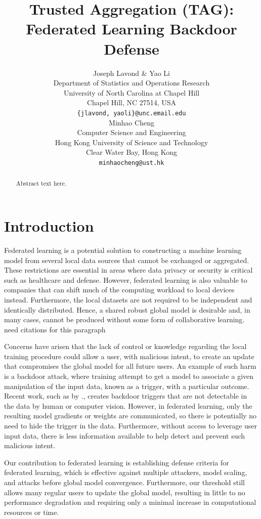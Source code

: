 \documentclass{article} %
\title{
    Trusted Aggregation (TAG): Federated Learning Backdoor Defense
}
\author{%
    Joseph Lavond \& Yao Li  \\
    Department of Statistics and Operations Research \\
    University of North Carolina at Chapel Hill \\
    Chapel Hill, NC 27514, USA \\
    \texttt{\{jlavond, yaoli\}@unc.email.edu} \\
    \And
    Minhao Cheng \\
    Computer Science and Engineering \\
    Hong Kong University of Science and Technology \\
    Clear Water Bay, Hong Kong \\
    \texttt{minhaocheng@ust.hk}
}
\newcommand{\yli}[1]{{\color{cyan}#1}}
\begin{document}
\maketitle

\begin{abstract}
Abstract text here.
\end{abstract}



\section{Introduction}

Federated learning is a potential solution to constructing a machine learning model from several local data sources that cannot be exchanged or aggregated. These restrictions are essential in areas where data privacy or security is critical such as healthcare and defense. However, federated learning is also valuable to companies that can shift much of the computing workload to local devices instead. Furthermore, the local datasets are not required to be independent and identically distributed. Hence, a shared robust global model is desirable and, in many cases, cannot be produced without some form of collaborative learning. \yli{need citations for this paragraph}


Concerns have arisen that the lack of control or knowledge regarding the local training procedure could allow a user, with malicious intent, to create an update that compromises the global model for all future users. An example of such harm is a backdoor attack, where training attempt to get a model to associate a given manipulation of the input data, known as a trigger, with a particular outcome. Recent work, such as by \cite{stamp-invisible}., creates backdoor triggers that are not detectable in the data by human or computer vision. However, in federated learning, only the resulting model gradients or weights are communicated, so there is potentially no need to hide the trigger in the data. Furthermore, without access to leverage user input data, there is less information available to help detect and prevent such malicious intent. 

Our contribution to federated learning is establishing defense criteria for federated learning, which is effective against multiple attackers, model scaling, and attacks before global model convergence. Furthermore, our threshold still allows many regular users to update the global model, resulting in little to no performance degradation and requiring only a minimal increase in computational resources or time.
\end{document}
